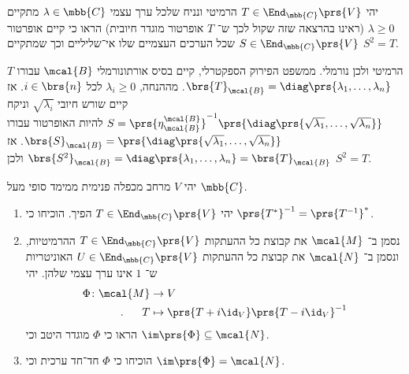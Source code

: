 \documentclass[a4paper,10pt,twoside,openany]{book}
\begin{document}
\begin{exercisechap}
יהי
$T \in \End_{\mbb{C}}\prs{V}$
הרמיטי ונניח שלכל ערך עצמי
$\lambda \in \mbb{C}$
מתקיים
$\lambda \geq 0$
(ראינו בהרצאה שזה שקול לכך ש־%
$T$
אופרטור מוגדר חיובית)
הראו כי קיים אופרטור
$S \in \End_{\mbb{C}}\prs{V}$
שכל הערכים העצמיים שלו אי־שליליים וכך שמתקיים
$S^2 = T$.
\end{exercisechap}

\begin{solution}
$T$
הרמיטי ולכן נורמלי. ממשפט הפירוק הספקטרלי, קיים בסיס אורתונורמלי
$\mcal{B}$
עבורו
$\brs{T}_\mcal{B} = \diag\prs{\lambda_1, \ldots, \lambda_n}$.
מההנחה,
$\lambda_i \geq 0$
לכל
$i \in \brs{n}$.
אז קיים שורש חיובי
$\sqrt{\lambda_i}$
וניקח
$S = \prs{\eta^\mcal{B}_\mcal{B}}^{-1} \prs{\diag\prs{\sqrt{\lambda_1}, \ldots, \sqrt{\lambda_n}}}$
להיות האופרטור עבורו
$\brs{S}_\mcal{B} = \prs{\diag\prs{\sqrt{\lambda_1}, \ldots, \sqrt{\lambda_n}}}$.
אז
$\brs{S^2}_\mcal{B} = \diag\prs{\lambda_1, \ldots, \lambda_n} = \brs{T}_\mcal{B}$
ולכן
$S^2 = T$.
\end{solution}

\begin{exercisechap}
יהי
$V$
מרחב מכפלה פנימית ממימד סופי מעל
$\mbb{C}$.

\begin{enumerate}
\item
יהי
$T \in \End_{\mbb{C}}\prs{V}$
הפיך. הוכיחו כי
$\prs{T^*}^{-1} = \prs{T^{-1}}^*$.

\item
נסמן ב־%
$\mcal{M}$
את קבוצת כל ההעתקות
$T \in \End_{\mbb{C}}\prs{V}$
ההרמיטיות, ונסמן ב־%
$\mcal{N}$
את קבוצת כל ההעתקות
$U \in \End_{\mbb{C}}\prs{V}$
האוניטריות ש־%
$1$
אינו ערך עצמי שלהן.
יהי
\begin{align*}
\Phi \colon \mcal{M} &\to V \\
\text{.} \hphantom{lala} T &\mapsto \prs{T + i \id_V} \prs{T - i \id_V}^{-1}
\end{align*}
הראו כי
$\Phi$
מוגדר היטב וכי
$\im\prs{\Phi} \subseteq \mcal{N}$.

\item
הוכיחו כי
$\Phi$
חד־חד ערכית וכי
$\im\prs{\Phi} = \mcal{N}$.
\end{enumerate}
\end{exercisechap}
\end{document}
